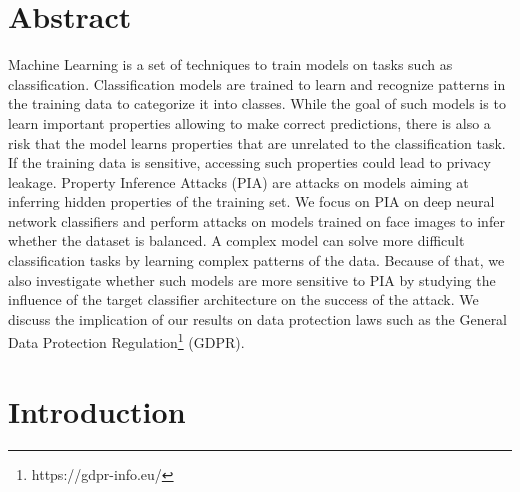 \documentclass[11pt]{article}
\begin{document}
\newpage

\section*{Abstract}

Machine Learning is a set of techniques to train models on tasks such as classification. Classification models are trained to learn and recognize patterns in the training data to categorize it into classes. While the goal of such models is to learn important properties allowing to make correct predictions, there is also a risk that the model learns properties that are unrelated to the classification task. If the training data is sensitive, accessing such properties could lead to privacy leakage. Property Inference Attacks (PIA) are attacks on models aiming at inferring hidden properties of the training set. We focus on PIA on deep neural network classifiers and perform attacks on models trained on face images to infer whether the dataset is balanced. A complex model can solve more difficult classification tasks by learning complex patterns of the data. Because of that, we also investigate whether such models are more sensitive to PIA by studying the influence of the target classifier architecture on the success of the attack. We discuss the implication of our results on data protection laws such as the General Data Protection Regulation\footnote{https://gdpr-info.eu/} (GDPR).

\section{Introduction}
\end{document}
